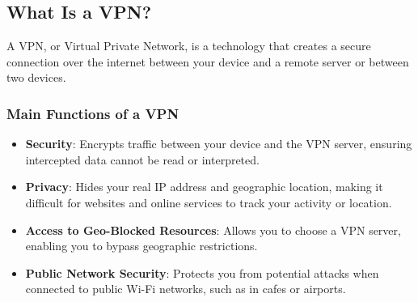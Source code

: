 \subsection{What Is a VPN?}

A VPN, or Virtual Private Network, is a technology that creates a secure connection over the internet between your device and a remote server or between two devices.

\subsubsection{Main Functions of a VPN}

\begin{itemize}
    \item \textbf{Security}: Encrypts traffic between your device and the VPN server, ensuring intercepted data cannot be read or interpreted.
    \item \textbf{Privacy}: Hides your real IP address and geographic location, making it difficult for websites and online services to track your activity or location.
    \item \textbf{Access to Geo-Blocked Resources}: Allows you to choose a VPN server, enabling you to bypass geographic restrictions.
    \item \textbf{Public Network Security}: Protects you from potential attacks when connected to public Wi-Fi networks, such as in cafes or airports.
\end{itemize}
